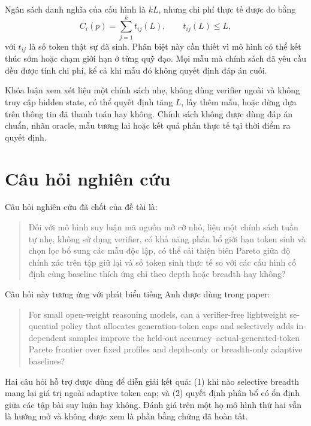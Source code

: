Ngân sách danh nghĩa của cấu hình là $kL$, nhưng chi phí thực tế được đo bằng
\begin{equation}
  C_i(p)=\sum_{j=1}^{k} t_{ij}(L), \qquad t_{ij}(L)\leq L,
\end{equation}
với $t_{ij}$ là số token thật sự đã sinh. Phân biệt này cần thiết vì mô hình có
thể kết thúc sớm hoặc chạm giới hạn ở từng quỹ đạo. Mọi mẫu mà chính sách đã yêu
cầu đều được tính chi phí, kể cả khi mẫu đó không quyết định đáp án cuối.

Khóa luận xem xét liệu một chính sách nhẹ, không dùng verifier ngoài và không
truy cập hidden state, có thể quyết định tăng $L$, lấy thêm mẫu, hoặc dừng dựa
trên thông tin đã thanh toán hay không. Chính sách không được dùng đáp án chuẩn,
nhãn oracle, mẫu tương lai hoặc kết quả phản thực tế tại thời điểm ra quyết
định.

\section{Câu hỏi nghiên cứu}

Câu hỏi nghiên cứu đã chốt của đề tài là:

\begin{quote}
Đối với mô hình suy luận mã nguồn mở cỡ nhỏ, liệu một chính sách tuần tự nhẹ,
không sử dụng verifier, có khả năng phân bổ giới hạn token sinh và chọn lọc bổ
sung các mẫu độc lập, có thể cải thiện biên Pareto giữa độ chính xác trên tập
giữ lại và số token sinh thực tế so với các cấu hình cố định cùng baseline
thích ứng chỉ theo depth hoặc breadth hay không?
\end{quote}

Câu hỏi này tương ứng với phát biểu tiếng Anh được dùng trong paper:

\begin{otherlanguage}{english}
\begin{quote}
For small open-weight reasoning models, can a verifier-free lightweight
sequential policy that allocates generation-token caps and selectively adds
independent samples improve the held-out accuracy--actual-generated-token
Pareto frontier over fixed profiles and depth-only or breadth-only adaptive
baselines?
\end{quote}
\end{otherlanguage}

Hai câu hỏi hỗ trợ được dùng để diễn giải kết quả: (1) khi nào selective
breadth mang lại giá trị ngoài adaptive token cap; và (2) quyết định phân bổ có
ổn định giữa các tập bài suy luận hay không. Đánh giá trên một họ mô hình thứ
hai vẫn là hướng mở và không được xem là phần bằng chứng đã hoàn tất.

